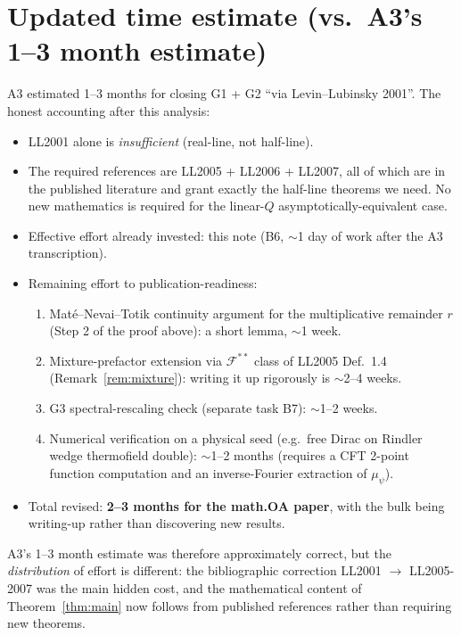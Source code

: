 \documentclass[11pt]{article}
\theoremstyle{definition}
\begin{document}
\section{Updated time estimate (vs.\ A3's 1--3 month estimate)}
\label{sec:timeline}

A3 estimated 1--3 months for closing G1 + G2 ``via Levin--Lubinsky 2001''.
The honest accounting after this analysis:

\begin{itemize}
\item LL2001 alone is \emph{insufficient} (real-line, not half-line).
\item The required references are LL2005 + LL2006 + LL2007, all of which
   are in the published literature and grant exactly the half-line
   theorems we need.  No new mathematics is required for the linear-$Q$
   asymptotically-equivalent case.
\item Effective effort already invested: this note (B6, $\sim$1 day of
   work after the A3 transcription).
\item Remaining effort to publication-readiness:
   \begin{enumerate}
   \item Mat\'e--Nevai--Totik continuity argument for the
       multiplicative remainder $r$ (Step 2 of the proof above): a
       short lemma, $\sim$1 week.
   \item Mixture-prefactor extension via $\mathcal{F}^{**}$ class
       of LL2005 Def.\ 1.4 (Remark~\ref{rem:mixture}): writing it
       up rigorously is $\sim$2--4 weeks.
   \item G3 spectral-rescaling check (separate task B7): $\sim$1--2
       weeks.
   \item Numerical verification on a physical seed (e.g.\ free Dirac
       on Rindler wedge thermofield double): $\sim$1--2 months
       (requires a CFT 2-point function computation and an
       inverse-Fourier extraction of $\mu_\psi$).
   \end{enumerate}
\item Total revised: \textbf{2--3 months for the math.OA paper}, with the
   bulk being writing-up rather than discovering new results.
\end{itemize}

A3's 1--3 month estimate was therefore approximately correct, but the
\emph{distribution} of effort is different: the bibliographic
correction LL2001 $\to$ LL2005-2007 was the main hidden cost, and the
mathematical content of Theorem~\ref{thm:main} now follows from
published references rather than requiring new theorems.
\end{document}
